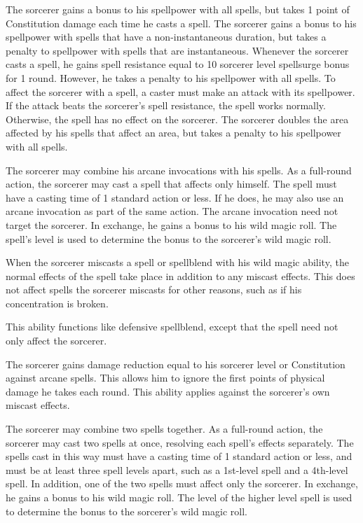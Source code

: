 The sorcerer gains a bonus to his spellpower with all spells, but takes 1 point of Constitution damage each time he casts a spell.
The sorcerer gains a bonus to his spellpower with spells that have a non-instantaneous duration, but takes a penalty to spellpower with spells that are instantaneous.
Whenever the sorcerer casts a spell, he gains spell resistance equal to 10 \add sorcerer level \add spellsurge bonus for 1 round.
However, he takes a penalty to his spellpower with all spells.
To affect the sorcerer with a spell, a caster must make an attack with its spellpower.
If the attack beats the sorcerer's spell resistance, the spell works normally.
Otherwise, the spell has no effect on the sorcerer.
The sorcerer doubles the area affected by his spells that affect an area, but takes a penalty to his spellpower with all spells.

The sorcerer may combine his arcane invocations with his spells.
As a full-round action, the sorcerer may cast a spell that affects only himself.
The spell must have a casting time of 1 standard action or less.
If he does, he may also use an arcane invocation as part of the same action.
The arcane invocation need not target the sorcerer.
In exchange, he gains a  bonus to his wild magic roll.
The spell's level is used to determine the bonus to the sorcerer's wild magic roll.

When the sorcerer miscasts a spell or spellblend with his wild magic ability, the normal effects of the spell take place in addition to any miscast effects.
This does not affect spells the sorcerer miscasts for other reasons, such as if his concentration is broken.

This ability functions like defensive spellblend, except that the spell need not only affect the sorcerer.

The sorcerer gains damage reduction equal to his sorcerer level or Constitution against arcane spells.
This allows him to ignore the first points of physical damage he takes each round.
This ability applies against the sorcerer's own miscast effects.

The sorcerer may combine two spells together.
As a full-round action, the sorcerer may cast two spells at once, resolving each spell's effects separately.
The spells cast in this way must have a casting time of 1 standard action or less, and must be at least three spell levels apart, such as a 1st-level spell and a 4th-level spell.
In addition, one of the two spells must affect only the sorcerer.
In exchange, he gains a  bonus to his wild magic roll.
The level of the higher level spell is used to determine the bonus to the sorcerer's wild magic roll.

